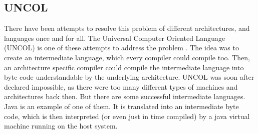 \subsection{UNCOL}
	There have been attempts to resolve this problem of different architectures, and languages once and for all. The Universal Computer Oriented Language (UNCOL) is one of these attempts to address the problem \cite{uncol}. The idea was to create an intermediate language, which every compiler could compile too. Then, an architecture specific compiler could compile the intermediate language into byte code understandable by the underlying architecture. UNCOL was soon after declared impossible, as there were too many different types of machines and architectures back then. But there are some successful intermediate languages. Java is an example of one of them. It is translated into an intermediate byte code, which is then interpreted (or even just in time compiled) by a java virtual machine running on the host system.